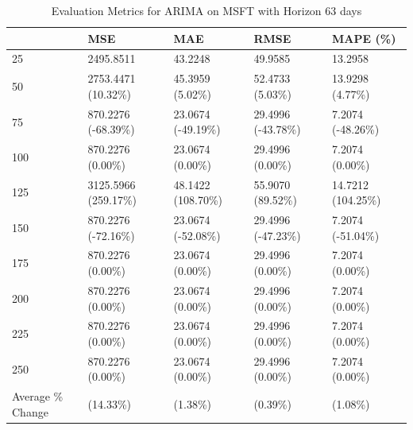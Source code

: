 \begin{table}
\caption{Evaluation Metrics for ARIMA on MSFT with Horizon 63 days}
\label{tab:arima_MSFT_h63_metrics}
\begin{tabular}{lllll}
\toprule
 & MSE & MAE & RMSE & MAPE (\%) \\
\midrule
25 & 2495.8511 & 43.2248 & 49.9585 & 13.2958 \\
50 & 2753.4471 (10.32\%) & 45.3959 (5.02\%) & 52.4733 (5.03\%) & 13.9298 (4.77\%) \\
75 & 870.2276 (-68.39\%) & 23.0674 (-49.19\%) & 29.4996 (-43.78\%) & 7.2074 (-48.26\%) \\
100 & 870.2276 (0.00\%) & 23.0674 (0.00\%) & 29.4996 (0.00\%) & 7.2074 (0.00\%) \\
125 & 3125.5966 (259.17\%) & 48.1422 (108.70\%) & 55.9070 (89.52\%) & 14.7212 (104.25\%) \\
150 & 870.2276 (-72.16\%) & 23.0674 (-52.08\%) & 29.4996 (-47.23\%) & 7.2074 (-51.04\%) \\
175 & 870.2276 (0.00\%) & 23.0674 (0.00\%) & 29.4996 (0.00\%) & 7.2074 (0.00\%) \\
200 & 870.2276 (0.00\%) & 23.0674 (0.00\%) & 29.4996 (0.00\%) & 7.2074 (0.00\%) \\
225 & 870.2276 (0.00\%) & 23.0674 (0.00\%) & 29.4996 (0.00\%) & 7.2074 (0.00\%) \\
250 & 870.2276 (0.00\%) & 23.0674 (0.00\%) & 29.4996 (0.00\%) & 7.2074 (0.00\%) \\
Average \% Change & (14.33\%) & (1.38\%) & (0.39\%) & (1.08\%) \\
\bottomrule
\end{tabular}
\end{table}
